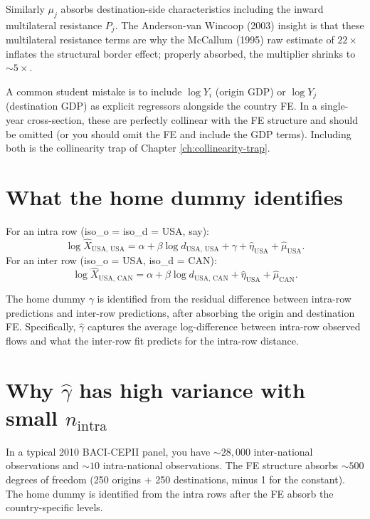 \documentclass[11pt,letterpaper,oneside]{book}
\theoremstyle{definition}
\theoremstyle{remark}
\begin{document}
Similarly $\mu_j$ absorbs destination-side characteristics including
the inward multilateral resistance $P_j$. The Anderson-van Wincoop
(2003) insight is that these multilateral resistance terms are why the
McCallum (1995) raw estimate of $22\times$ inflates the structural
border effect; properly absorbed, the multiplier shrinks to $\sim 5\times$.

\begin{insight}
A common student mistake is to include $\log Y_i$ (origin GDP) or
$\log Y_j$ (destination GDP) as explicit regressors alongside the
country FE. In a single-year cross-section, these are perfectly
collinear with the FE structure and should be omitted (or you should
omit the FE and include the GDP terms). Including both is the
collinearity trap of Chapter \ref{ch:collinearity-trap}.
\end{insight}

\section{What the home dummy identifies}

For an intra row (iso\_o = iso\_d = USA, say):
\begin{equation*}
\log \hat{X}_{\text{USA, USA}} = \alpha + \beta \log d_{\text{USA, USA}} + \gamma + \hat{\eta}_{\text{USA}} + \hat{\mu}_{\text{USA}}.
\end{equation*}
For an inter row (iso\_o = USA, iso\_d = CAN):
\begin{equation*}
\log \hat{X}_{\text{USA, CAN}} = \alpha + \beta \log d_{\text{USA, CAN}} + \hat{\eta}_{\text{USA}} + \hat{\mu}_{\text{CAN}}.
\end{equation*}

The home dummy $\gamma$ is identified from the residual difference
between intra-row predictions and inter-row predictions, after
absorbing the origin and destination FE. Specifically, $\hat{\gamma}$
captures the average log-difference between intra-row observed flows
and what the inter-row fit predicts for the intra-row distance.

\section{Why $\hat{\gamma}$ has high variance with small $n_{\text{intra}}$}

In a typical 2010 BACI-CEPII panel, you have $\sim 28{,}000$
inter-national observations and $\sim 10$ intra-national observations.
The FE structure absorbs $\sim 500$ degrees of freedom (250 origins +
250 destinations, minus 1 for the constant). The home dummy is
identified from the intra rows after the FE absorb the country-specific
levels.
\end{document}
